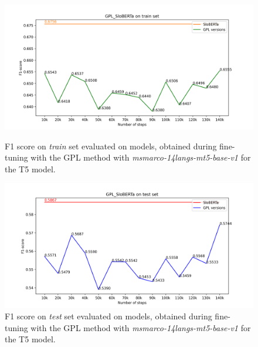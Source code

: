 \documentclass[fleqn,moreauthors,10pt]{ds_report}
\begin{document}
\begin{figure}
    \centering
    \begin{minipage}{0.5\textwidth}
        \centering
        \includegraphics[width=\linewidth]{GPL__SloBERTa_train.png}
        \caption{F1 score on \textit{train} set evaluated on models, obtained during fine-tuning with the GPL method with {\it msmarco-14langs-mt5-base-v1} \cite{msmarco14langs} for the T5 model.}
		\label{fig:gpl-sloberta-versions-train}
    \end{minipage}\hfill
    \begin{minipage}{0.5\textwidth}
        \centering
        \includegraphics[width=\linewidth]{GPL__SloBERTa_test.png}
        \caption{F1 score on \textit{test} set evaluated on models, obtained during fine-tuning with the GPL method with {\it msmarco-14langs-mt5-base-v1} \cite{msmarco14langs} for the T5 model.}
		\label{fig:gpl-sloberta-versions}
    \end{minipage}
\end{figure}
\end{document}
